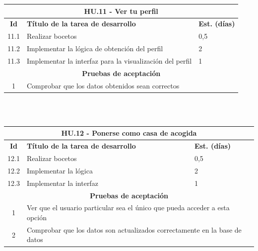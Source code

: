 \begin{tabular}{|c|p{9.5cm}|p{1cm}|}
	\hline
	\multicolumn{3}{|c|}{\textbf{HU.11 - Ver tu perfil}} \\
	\hline
	\textbf{Id} & \textbf{Título de la tarea de desarrollo} & \textbf{Est. (días)} \\
	\hline
	11.1 & Realizar bocetos & 0,5 \\ \hline
	11.2 &  Implementar la lógica de obtención del perfil & 2 \\ \hline
	11.3 &  Implementar la interfaz para la visualización del perfil & 1 \\ \hline
	\multicolumn{3}{|c|}{\textbf{Pruebas de aceptación}} \\ \hline
	1 & \multicolumn{2}{|p{10cm}|}{Comprobar que los datos obtenidos sean correctos} \\ \hline
	
\end{tabular} \\ \\

\begin{tabular}{|c|p{9.5cm}|p{1cm}|}
	\hline
	\multicolumn{3}{|c|}{\textbf{HU.12 - Ponerse como casa de acogida}} \\
	\hline
	\textbf{Id} & \textbf{Título de la tarea de desarrollo} & \textbf{Est. (días)} \\
	\hline
	12.1 & Realizar bocetos & 0,5 \\ \hline
	12.2 &  Implementar la lógica & 2 \\ \hline
	12.3 &  Implementar la interfaz & 1 \\ \hline
	\multicolumn{3}{|c|}{\textbf{Pruebas de aceptación}} \\ \hline
	1 & \multicolumn{2}{|p{10cm}|}{Ver que el usuario particular sea el único que pueda acceder a esta opción} \\ \hline
	2 & \multicolumn{2}{|p{10cm}|}{Comprobar que los datos son actualizados correctamente en la base de datos} \\ \hline
	
\end{tabular} \\ \\

